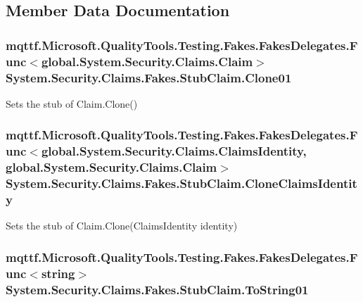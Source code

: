 \subsection{Member Data Documentation}
\hypertarget{class_system_1_1_security_1_1_claims_1_1_fakes_1_1_stub_claim_a38ec05209060a1dd6710a0c9b2a1487b}{
\subsubsection[{Clone01}]{\setlength{\rightskip}{0pt plus 5cm}mqttf.\-Microsoft.\-Quality\-Tools.\-Testing.\-Fakes.\-Fakes\-Delegates.\-Func$<$global.\-System.\-Security.\-Claims.\-Claim$>$ System.\-Security.\-Claims.\-Fakes.\-Stub\-Claim.\-Clone01}}\label{class_system_1_1_security_1_1_claims_1_1_fakes_1_1_stub_claim_a38ec05209060a1dd6710a0c9b2a1487b}


Sets the stub of Claim.\-Clone()

\hypertarget{class_system_1_1_security_1_1_claims_1_1_fakes_1_1_stub_claim_ace1a120885856c4767aecd6ae75a1099}{
\subsubsection[{Clone\-Claims\-Identity}]{\setlength{\rightskip}{0pt plus 5cm}mqttf.\-Microsoft.\-Quality\-Tools.\-Testing.\-Fakes.\-Fakes\-Delegates.\-Func$<$global.\-System.\-Security.\-Claims.\-Claims\-Identity, global.\-System.\-Security.\-Claims.\-Claim$>$ System.\-Security.\-Claims.\-Fakes.\-Stub\-Claim.\-Clone\-Claims\-Identity}}\label{class_system_1_1_security_1_1_claims_1_1_fakes_1_1_stub_claim_ace1a120885856c4767aecd6ae75a1099}


Sets the stub of Claim.\-Clone(\-Claims\-Identity identity)

\hypertarget{class_system_1_1_security_1_1_claims_1_1_fakes_1_1_stub_claim_aa7b627ad2b53c4271bd54353a9309c10}{
\subsubsection[{To\-String01}]{\setlength{\rightskip}{0pt plus 5cm}mqttf.\-Microsoft.\-Quality\-Tools.\-Testing.\-Fakes.\-Fakes\-Delegates.\-Func$<$string$>$ System.\-Security.\-Claims.\-Fakes.\-Stub\-Claim.\-To\-String01}}\label{class_system_1_1_security_1_1_claims_1_1_fakes_1_1_stub_claim_aa7b627ad2b53c4271bd54353a9309c10}


